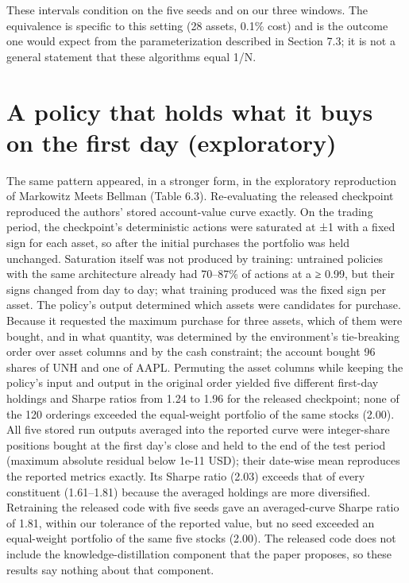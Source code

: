 \documentclass[12pt,a4paper]{report}
\newcounter{none} %
\begin{document}
These intervals condition on the five seeds and on our three windows.
The equivalence is specific to this setting (28 assets, 0.1\% cost) and
is the outcome one would expect from the parameterization described in
Section 7.3; it is not a general statement that these algorithms equal
1/N.

\section{A policy that holds what it buys on the first day
(exploratory)}\label{a-policy-that-holds-what-it-buys-on-the-first-day-exploratory}

The same pattern appeared, in a stronger form, in the exploratory
reproduction of Markowitz Meets Bellman (Table 6.3). Re-evaluating the
released checkpoint reproduced the authors' stored account-value curve
exactly. On the trading period, the checkpoint's deterministic actions
were saturated at ±1 with a fixed sign for each asset, so after the
initial purchases the portfolio was held unchanged. Saturation itself
was not produced by training: untrained policies with the same
architecture already had 70--87\% of actions at \textbar a\textbar{} ≥
0.99, but their signs changed from day to day; what training produced
was the fixed sign per asset. The policy's output determined which
assets were candidates for purchase. Because it requested the maximum
purchase for three assets, which of them were bought, and in what
quantity, was determined by the environment's tie-breaking order over
asset columns and by the cash constraint; the account bought 96 shares
of UNH and one of AAPL. Permuting the asset columns while keeping the
policy's input and output in the original order yielded five different
first-day holdings and Sharpe ratios from 1.24 to 1.96 for the released
checkpoint; none of the 120 orderings exceeded the equal-weight
portfolio of the same stocks (2.00). All five stored run outputs
averaged into the reported curve were integer-share positions bought at
the first day's close and held to the end of the test period (maximum
absolute residual below 1e-11 USD); their date-wise mean reproduces the
reported metrics exactly. Its Sharpe ratio (2.03) exceeds that of every
constituent (1.61--1.81) because the averaged holdings are more
diversified. Retraining the released code with five seeds gave an
averaged-curve Sharpe ratio of 1.81, within our tolerance of the
reported value, but no seed exceeded an equal-weight portfolio of the
same five stocks (2.00). The released code does not include the
knowledge-distillation component that the paper proposes, so these
results say nothing about that component.
\end{document}
